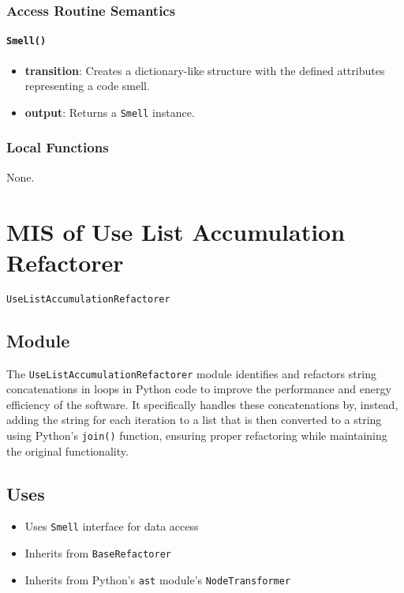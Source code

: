 \documentclass[12pt, titlepage]{article}
\begin{document}
\subsubsection{Access Routine Semantics}

\paragraph{\texttt{Smell()}}
\begin{itemize}
  \item \textbf{transition}: Creates a dictionary-like structure with the defined attributes representing a code smell.
  \item \textbf{output}: Returns a \texttt{Smell} instance.
\end{itemize}

\subsubsection{Local Functions}
None.
  

\newpage

\section{MIS of Use List Accumulation Refactorer} \label{mis:ListAccum}

\texttt{UseListAccumulationRefactorer}

\subsection{Module}

The \texttt{UseListAccumulationRefactorer} module identifies and refactors 
string concatenations in loops in Python code to improve the performance and energy efficiency of the software. It specifically handles these concatenations by, instead, adding the string for each iteration to a list that is then converted to a string using Python's \texttt{join()} function, ensuring proper refactoring while maintaining the original functionality.

\subsection{Uses}
\begin{itemize}
  \item Uses \texttt{Smell} interface for data access
  \item Inherits from \texttt{BaseRefactorer}
  \item Inherits from Python's \texttt{ast} module's \texttt{NodeTransformer}
\end{itemize}
  
\end{document}
